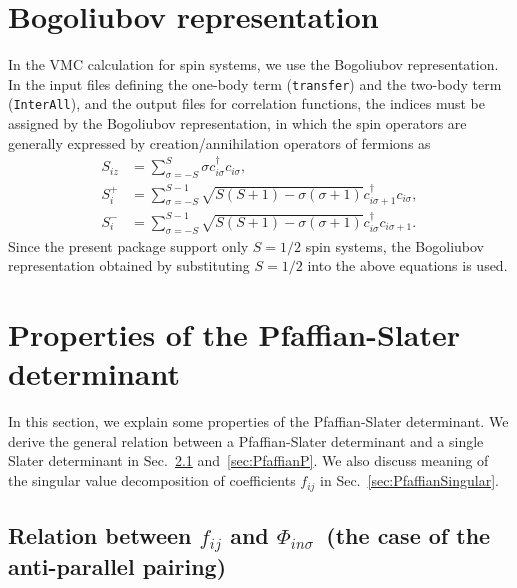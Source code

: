 \section{Bogoliubov representation}\label{sec_bogoliubov_rep}

In the VMC calculation for spin systems, we use the Bogoliubov representation.
In the input files defining the one-body term (\verb|transfer|) and the two-body term (\verb|InterAll|),
and the output files for correlation functions, the indices must be assigned by the Bogoliubov representation,
in which the spin operators are generally expressed by creation/annihilation operators of fermions as
\begin{align}
  S_{i z} &= \sum_{\sigma = -S}^{S} \sigma c_{i \sigma}^\dagger c_{i \sigma},
  \\
  S_{i}^+ &= \sum_{\sigma = -S}^{S-1} 
  \sqrt{S(S+1) - \sigma(\sigma+1)} 
  c_{i \sigma+1}^\dagger c_{i \sigma},
  \\
  S_{i}^- &= \sum_{\sigma = -S}^{S-1} 
  \sqrt{S(S+1) - \sigma(\sigma+1)} 
  c_{i \sigma}^\dagger c_{i \sigma+1}.
\end{align}
Since the present package support only $S=1/2$ spin systems, the Bogoliubov representation obtained 
by substituting $S=1/2$ into the above equations is used.

\section{Properties of the Pfaffian-Slater determinant}
\label{sec:PuffAndSlater}

In this section, we explain some properties of the Pfaffian-Slater determinant. 
We derive the general relation between a Pfaffian-Slater determinant and a single Slater determinant
in Sec.~\ref{sec:PfaffianAP} and~\ref{sec:PfaffianP}.
We also discuss meaning of the singular value decomposition of coefficients $f_{ij}$
in Sec.~\ref{sec:PfaffianSingular}.

\subsection{Relation between $f_{ij}$ and $\Phi_{in\sigma}$~(the case of the anti-parallel pairing)}
\label{sec:PfaffianAP}

